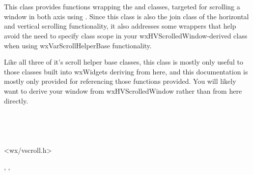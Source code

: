 
\section{}\label{wxvarhvscrollhelper}

This class provides functions wrapping the 
 and
 classes, targeted for
scrolling a window in both axis using
. Since this class is also
the join class of the horizontal and vertical scrolling functionality, it
also addresses some wrappers that help avoid the need to specify class scope
in your wxHVScrolledWindow-derived class when using wxVarScrollHelperBase
functionality.

Like all three of it's scroll helper base classes, this class is mostly only
useful to those classes built into wxWidgets deriving from here, and this
documentation is mostly only provided for referencing those functions
provided. You will likely want to derive your window from wxHVScrolledWindow
rather than from here directly.


\\

\\


<wx/vscroll.h>


,
\rtfsp{},
\rtfsp{}



\label{wxvarhvscrollhelperwxvarhvscrollhelper}

